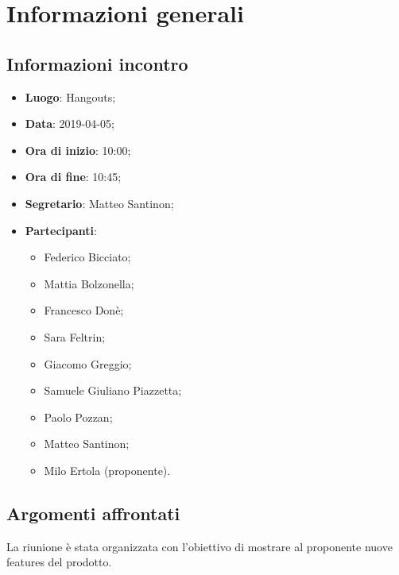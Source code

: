 \section{Informazioni generali}

\subsection{Informazioni incontro}
\begin{itemize}
\item \textbf{Luogo}: Hangouts;
\item \textbf{Data}: 2019-04-05;
\item \textbf{Ora di inizio}: 10:00;
\item \textbf{Ora di fine}: 10:45;
\item \textbf{Segretario}: Matteo Santinon;
\item \textbf{Partecipanti}: 
\begin{itemize}
	\item Federico Bicciato;
	\item Mattia Bolzonella;
	\item Francesco Donè;
	\item Sara Feltrin;
	\item Giacomo Greggio;
	\item Samuele Giuliano Piazzetta;
	\item Paolo Pozzan;
	\item Matteo Santinon;
	\item Milo Ertola (proponente).
\end{itemize}
\end{itemize}

\subsection{Argomenti affrontati}
La riunione è stata organizzata con l'obiettivo di mostrare al proponente nuove features del prodotto.

